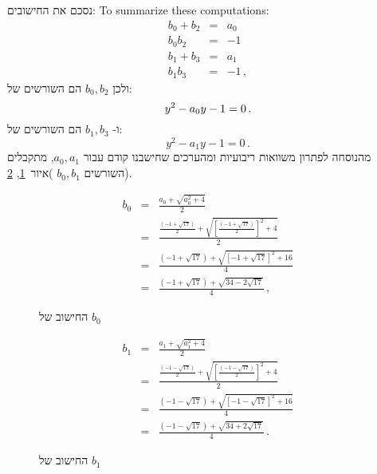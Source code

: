 \documentclass[11pt,a4paper]{article}
\newenvironment{form}[1]{%
\begin{displaymath}%
\renewcommand{\arraystretch}{#1}%
\begin{array}{lcl}}%
{\end{array}%
\end{displaymath}%
}
\newcommand*{\disfrac}[2]{\displaystyle\frac{#1}{#2}}
\begin{document}
נסכם את החישובים:
To summarize these computations:
\begin{form}{1.2}
b_0+b_2&=&a_0\\
b_0b_2&=&-1\\
b_1+b_3&=&a_1\\
b_1b_3&=&-1\,,
\end{form}
ולכן
$b_0,b_2$ 
הם השורשים של:
\[
y^2-a_0y-1= 0\,.\\
\]
ו-%
$b_1,b_3$
הם השורשים של:
\[
y^2-a_1y-1 =0\,.
\]
מהנוסחה לפתרון משוואות ריבועיות ומהערכים שחישבנו קודם עבור 
$a_0,a_1$,
מתקבלים השורשים
$b_0,b_1$ )איור~\ref{fig.b0}, \ref{fig.b1}).
\begin{figure}[tb]
\begin{form}{2.6}
b_0&=&\disfrac{a_0+\sqrt{a_0^2+4}}{2}\\
&=&\disfrac{
     \disfrac{(-1+\sqrt{17})}{2} + 
     \sqrt{\left[\disfrac{(-1+\sqrt{17})}{2}\right]^2+4}
   }{2}\\
&=&\disfrac{
     (-1+\sqrt{17}) + 
     \sqrt{\left[-1+\sqrt{17}\right]^2+16}
   }{4}\\
&=&\disfrac{
     (-1+\sqrt{17}) + 
     \sqrt{34-2\sqrt{17}}
   }{4}\,,
\end{form}\vspace{-2em}
\caption{החישוב של $b_0$}\label{fig.b0}
\end{figure}
\begin{figure}
\begin{form}{2.8}
b_1&=&\disfrac{a_1+\sqrt{a_1^2+4}}{2}\\
&=&\disfrac{
     \disfrac{(-1-\sqrt{17})}{2} + 
     \sqrt{\left[\disfrac{(-1-\sqrt{17})}{2}\right]^2+4}
   }{2}\\
&=&\disfrac{
     (-1-\sqrt{17}) + 
     \sqrt{\left[-1-\sqrt{17}\right]^2+16}
   }{4}\\
&=&\disfrac{
     (-1-\sqrt{17}) + 
     \sqrt{34+2\sqrt{17}}
   }{4}\,.
\end{form}\vspace{-2em}
\caption{החישוב של $b_1$}\label{fig.b1}
\end{figure}
\end{document}
